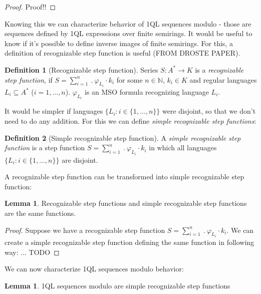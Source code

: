 \documentclass[12pt]{article}
\theoremstyle{definition}
\newtheorem{definition}{Definition}[section]
\newtheorem{lemma}[theorem]{Lemma}
\begin{document}
\begin{proof}
    Proof!!
\end{proof}

Knowing this we can characterize behavior of 1QL sequences modulo - those are sequences defined by 1QL expressions over finite semirings. It would be useful to know if it's possible to define inverse images of finite semirings. For this, a definition of recognizable step function is useful (FROM DROSTE PAPER).

\begin{definition}[Recognizable step function]
    Series $S: A^* \rightarrow K$ is a \textit{recognizable step function}, if $S = \sum_{i = 1}^{n} \ . \ \varphi_{L_i} \cdot k_i$ for some $n \in \mathbb{N}$, $k_i \in K$ and regular languages $L_i \subseteq A^*$ ($i=1,\ldots,n$). $\varphi_{L_i}$ is an MSO formula recognizing language $L_i$.
\end{definition}

It would be simpler if languages $\{L_i : i \in \{1,\ldots,n\}\}$ were disjoint, so that we don't need to do any addition. For this we can define \textit{simple recognizable step functions}:

\begin{definition}[Simple recognizable step function]
    A \textit{simple recognizable step function} is a step function $S = \sum_{i = 1}^{n} \ . \ \varphi_{L_i} \cdot k_i$ in which all languages $\{L_i : i \in \{1,\ldots,n\}\}$ are disjoint.
\end{definition}

A recognizable step function can be transformed into simple recognizable step function:

\begin{lemma}
    Recognizable step functions and simple recognizable step functions are the same functions.
\end{lemma}

\begin{proof}
    Suppose we have a recognizable step function $S = \sum_{i = 1}^{n} \ . \ \varphi_{L_i} \cdot k_i$. We can create a simple recognizable step function defining the same function in following way: ... TODO
\end{proof}

We can now characterize 1QL sequences modulo behavior:

\begin{lemma}
    1QL sequences modulo are simple recognizable step functions
\end{lemma}
\end{document}

